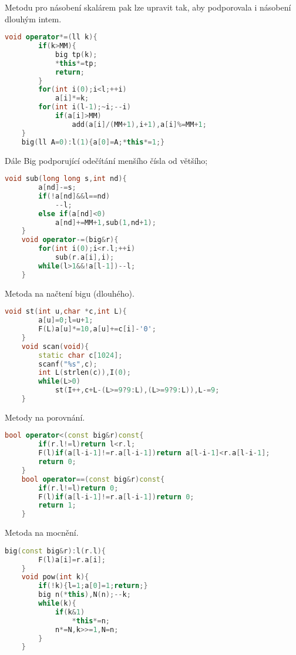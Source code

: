 \documentclass[11pt]{article}
\begin{document}
Metodu pro násobení skalárem pak lze upravit tak, aby podporovala i násobení dlouhým intem.
\begin{lstlisting}[language=C++]
    void operator*=(ll k){
        if(k>MM){
            big tp(k);
            *this*=tp;
            return;
        }
        for(int i(0);i<l;++i)
            a[i]*=k;
        for(int i(l-1);~i;--i)
            if(a[i]>MM)
                add(a[i]/(MM+1),i+1),a[i]%=MM+1;
    }
    big(ll A=0):l(1){a[0]=A;*this*=1;}
\end{lstlisting}
\begin{center}
Dále Big podporující odečítání menšího čísla od většího;
\end{center}
\begin{lstlisting}[language=C++]
    void sub(long long s,int nd){
        a[nd]-=s;
        if(!a[nd]&&l==nd)
            --l;
        else if(a[nd]<0)
            a[nd]+=MM+1,sub(1,nd+1);
    }
    void operator-=(big&r){
        for(int i(0);i<r.l;++i)
            sub(r.a[i],i);    
		while(l>1&&!a[l-1])--l;
    }
\end{lstlisting}
\begin{center}
Metoda na načtení bigu (dlouhého).
\end{center}
\begin{lstlisting}[language=C++]
    void st(int u,char *c,int L){
        a[u]=0;l=u+1;
        F(L)a[u]*=10,a[u]+=c[i]-'0';
    }
    void scan(void){
        static char c[1024];
        scanf("%s",c);
        int L(strlen(c)),I(0);
        while(L>0)
            st(I++,c+L-(L>=9?9:L),(L>=9?9:L)),L-=9;
    }
\end{lstlisting}
\begin{center}
Metody na porovnání.
\end{center}
\begin{lstlisting}[language=C++]
    bool operator<(const big&r)const{
        if(r.l!=l)return l<r.l;
        F(l)if(a[l-i-1]!=r.a[l-i-1])return a[l-i-1]<r.a[l-i-1];
        return 0;
    }
    bool operator==(const big&r)const{
        if(r.l!=l)return 0;
        F(l)if(a[l-i-1]!=r.a[l-i-1])return 0;
        return 1;
    }
\end{lstlisting}
\begin{center}
Metoda na mocnění.
\end{center}
\begin{lstlisting}[language=C++]
    big(const big&r):l(r.l){
        F(l)a[i]=r.a[i];
    }
    void pow(int k){
        if(!k){l=1;a[0]=1;return;}
        big n(*this),N(n);--k;
        while(k){
            if(k&1)
                *this*=n;
            n*=N,k>>=1,N=n;
        }
    }
\end{lstlisting}
\end{document}
